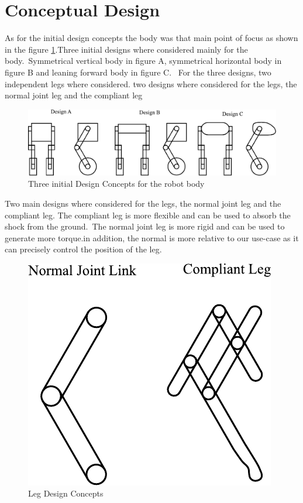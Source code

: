 \section{Conceptual Design}
As for the initial design concepts the body was that main point of focus as shown in the figure \ref{fig:initialdesigns}.Three initial designs where considered mainly for the body.\ Symmetrical vertical body in figure A, symmetrical horizontal body in figure B and leaning forward body in figure C\@.
\ For the three designs, two independent legs where considered.
two designs where considered for the legs, the normal joint leg and the compliant leg

\begin{figure}[h]
	\centering
	\includegraphics[width=1\linewidth]{Conceptual Design}
	\caption[Initial Design Concepts]{Three initial Design Concepts for the robot body}
	\label{fig:initialdesigns}
\end{figure}
Two main designs where considered for the legs, the normal joint leg and the compliant leg.
The compliant leg is more flexible and can be used to absorb the shock from the ground.\ The normal joint leg is more rigid and can be used to generate more torque.in addition, the normal is more relative to our use-case as it can precisely control the position of the leg.
\begin{figure}[h]
	\centering
	\includegraphics[width=0.4\linewidth]{Leg Design}
	\caption[Leg Design Concepts]{Leg Design Concepts}
	\label{fig:legdesignsjbhi}
\end{figure}

